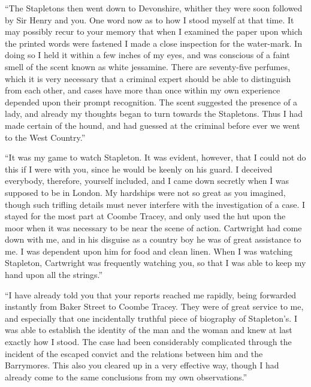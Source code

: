 \documentclass[paper=5.5in:8.5in,BCOR=7mm,twoside,DIV=calc,12pt,usegeometry,openany,chapterprefix,endperiod]{scrbook} %
\begin{document}
\enquote{The Stapletons then went down to Devonshire, whither they were soon followed by Sir Henry and you. One word now as to how I stood myself at that time. It may possibly recur to your memory that when I examined the paper upon which the printed words were fastened I made a close inspection for the water-mark. In doing so I held it within a few inches of my eyes, and was conscious of a faint smell of the scent known as white jessamine. There are seventy-five perfumes, which it is very necessary that a criminal expert should be able to distinguish from each other, and cases have more than once within my own experience depended upon their prompt recognition. The scent suggested the presence of a lady, and already my thoughts began to turn towards the Stapletons. Thus I had made certain of the hound, and had guessed at the criminal before ever we went to the West Country.}

\enquote{It was my game to watch Stapleton. It was evident, however, that I could not do this if I were with you, since he would be keenly on his guard. I deceived everybody, therefore, yourself included, and I came down secretly when I was supposed to be in London. My hardships were not so great as you imagined, though such trifling details must never interfere with the investigation of a case. I stayed for the most part at Coombe Tracey, and only used the hut upon the moor when it was necessary to be near the scene of action. Cartwright had come down with me, and in his disguise as a country boy he was of great assistance to me. I was dependent upon him for food and clean linen. When I was watching Stapleton, Cartwright was frequently watching you, so that I was able to keep my hand upon all the strings.}

\enquote{I have already told you that your reports reached me rapidly, being forwarded instantly from Baker Street to Coombe Tracey. They were of great service to me, and especially that one incidentally truthful piece of biography of Stapleton's. I was able to establish the identity of the man and the woman and knew at last exactly how I stood. The case had been considerably complicated through the incident of the escaped convict and the relations between him and the Barrymores. This also you cleared up in a very effective way, though I had already come to the same conclusions from my own observations.}
\end{document}
